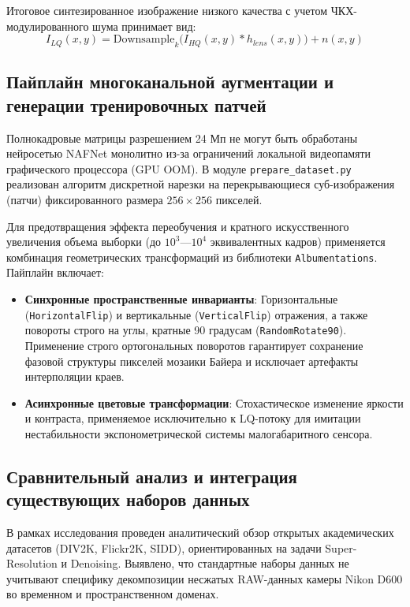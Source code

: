 \documentclass[12pt,a4paper]{article}
\begin{document}
Итоговое синтезированное изображение низкого качества с учетом ЧКХ-модулированного шума принимает вид:
\begin{equation}
    I_{LQ}(x, y) = \text{Downsample}_k \Big( I_{HQ}(x, y) * h_{lens}(x, y) \Big) + n(x, y)
\end{equation}

\subsection{Пайплайн многоканальной аугментации и генерации тренировочных патчей}
Полнокадровые матрицы разрешением 24 Мп не могут быть обработаны нейросетью NAFNet монолитно из-за ограничений локальной видеопамяти графического процессора (GPU OOM). В модуле \texttt{prepare\_dataset.py} реализован алгоритм дискретной нарезки на перекрывающиеся суб-изображения (патчи) фиксированного размера $256 \times 256$ пикселей.

Для предотвращения эффекта переобучения и кратного искусственного увеличения объема выборки (до $10^3$---$10^4$ эквивалентных кадров) применяется комбинация геометрических трансформаций из библиотеки \texttt{Albumentations}. Пайплайн включает:
\begin{itemize}
    \item \textbf{Синхронные пространственные инварианты}: Горизонтальные (\texttt{HorizontalFlip}) и вертикальные (\texttt{VerticalFlip}) отражения, а также повороты строго на углы, кратные 90 градусам (\texttt{RandomRotate90}). Применение строго ортогональных поворотов гарантирует сохранение фазовой структуры пикселей мозаики Байера и исключает артефакты интерполяции краев.
    \item \textbf{Асинхронные цветовые трансформации}: Стохастическое изменение яркости и контраста, применяемое исключительно к LQ-потоку для имитации нестабильности экспонометрической системы малогабаритного сенсора.
\end{itemize}

\subsection{Сравнительный анализ и интеграция существующих наборов данных}
В рамках исследования проведен аналитический обзор открытых академических датасетов (DIV2K, Flickr2K, SIDD), ориентированных на задачи Super-Resolution и Denoising. Выявлено, что стандартные наборы данных не учитывают специфику декомпозиции несжатых RAW-данных камеры Nikon D600 во временном и пространственном доменах.
\end{document}
